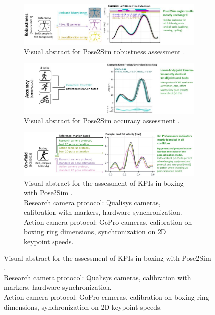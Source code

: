\begin{figure}[!htp]
	\centering
	\begin{subfigure}[b]{1\textwidth}
            \centering
            \def\svgwidth{1\columnwidth}
            \fontsize{10pt}{10pt}\selectfont
            \includegraphics[width=\linewidth]{"../Intro/Figures/Fig_VisAbstract2.JPG"}
            \caption{Visual abstract for Pose2Sim robustness assessment \cite{Pagnon2021}.}
            \label{fig_visabstract2_1}
	\end{subfigure}
	\vskip 0.8cm
      \begin{subfigure}[b]{1\textwidth}
            \centering
            \def\svgwidth{1\columnwidth}
            \fontsize{10pt}{10pt}\selectfont
            \includegraphics[width=\linewidth]{"../Intro/Figures/Fig_VisAbstract3.JPG"}
            \caption{Visual abstract for Pose2Sim accuracy assessment \cite{Pagnon2022a}.}
            \label{fig_visabstract3_1}
	\end{subfigure}
      \vskip 0.8cm
	\begin{subfigure}[b]{1\textwidth}
            \centering
            \captionsetup{justification=centering}
            \def\svgwidth{1\columnwidth}
            \fontsize{10pt}{10pt}\selectfont
            \includegraphics[width=\linewidth]{"../Intro/Figures/Fig_VisAbstract4.JPG"}
            \caption{Visual abstract for the assessment of KPIs in boxing with Pose2Sim \cite{Pagnon2022c}. \\Research camera protocol: Qualisys cameras, calibration with markers, hardware synchronization. \\Action camera protocol: GoPro cameras, calibration on boxing ring dimensions, synchronization on 2D keypoint speeds.}

\end{subfigure}
\end{figure}
